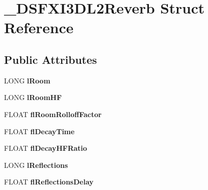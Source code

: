 \hypertarget{struct___d_s_f_x_i3_d_l2_reverb}{}\section{\+\_\+\+D\+S\+F\+X\+I3\+D\+L2\+Reverb Struct Reference}
\label{struct___d_s_f_x_i3_d_l2_reverb}
\subsection*{Public Attributes}
\begin{DoxyCompactItemize}
\item 
L\+O\+NG {\bfseries l\+Room}\hypertarget{struct___d_s_f_x_i3_d_l2_reverb_ab13aaa6ba4be56644c02644ca402d570}{}\label{struct___d_s_f_x_i3_d_l2_reverb_ab13aaa6ba4be56644c02644ca402d570}

\item 
L\+O\+NG {\bfseries l\+Room\+HF}\hypertarget{struct___d_s_f_x_i3_d_l2_reverb_aa53e3d36170276d451010a1dde387cec}{}\label{struct___d_s_f_x_i3_d_l2_reverb_aa53e3d36170276d451010a1dde387cec}

\item 
F\+L\+O\+AT {\bfseries fl\+Room\+Rolloff\+Factor}\hypertarget{struct___d_s_f_x_i3_d_l2_reverb_a02d8a35d2944994b91dff97356f073a4}{}\label{struct___d_s_f_x_i3_d_l2_reverb_a02d8a35d2944994b91dff97356f073a4}

\item 
F\+L\+O\+AT {\bfseries fl\+Decay\+Time}\hypertarget{struct___d_s_f_x_i3_d_l2_reverb_a8bb0bae9e67a662159cc5bf83f9173bb}{}\label{struct___d_s_f_x_i3_d_l2_reverb_a8bb0bae9e67a662159cc5bf83f9173bb}

\item 
F\+L\+O\+AT {\bfseries fl\+Decay\+H\+F\+Ratio}\hypertarget{struct___d_s_f_x_i3_d_l2_reverb_abb05a3558e26e53efd2129973b6e1daf}{}\label{struct___d_s_f_x_i3_d_l2_reverb_abb05a3558e26e53efd2129973b6e1daf}

\item 
L\+O\+NG {\bfseries l\+Reflections}\hypertarget{struct___d_s_f_x_i3_d_l2_reverb_a5d9820ee3957c4de2be5b040b6159e8d}{}\label{struct___d_s_f_x_i3_d_l2_reverb_a5d9820ee3957c4de2be5b040b6159e8d}

\item 
F\+L\+O\+AT {\bfseries fl\+Reflections\+Delay}\hypertarget{struct___d_s_f_x_i3_d_l2_reverb_a68ac514f26251a7d08ba0c7129347a62}{}\label{struct___d_s_f_x_i3_d_l2_reverb_a68ac514f26251a7d08ba0c7129347a62}


\end{DoxyCompactItemize}
